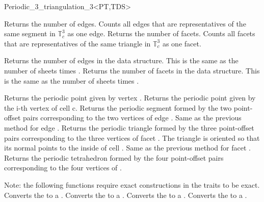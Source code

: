 \begin{ccRefClass}{Periodic_3_triangulation_3<PT,TDS>}

{Returns the number of edges. Counts all edges that are
  representatives of the same segment in $\mathbb T_c^3$ as one edge.}
\ccGlue
{}
{Returns the number of facets. Counts all facets that are
  representatives of the same triangle in $\mathbb T_c^3$ as one
  facet.}

\begin{ccAdvanced}
{Returns the number of edges in the data structure. This is the same
  as the number of sheets times .}
\ccGlue
{}
{Returns the number of facets in the data structure. This is the same
  as the number of sheets times .}
\end{ccAdvanced}


{Returns the periodic point given by vertex .}
\ccGlue
{}
{Returns the periodic point given by the i-th vertex of cell c.
}
\ccGlue
{} 
{Returns the periodic segment formed by the two point-offset pairs
  corresponding to the two vertices of edge .
}
\ccGlue
{}
{Same as the previous method for edge .}
\ccGlue
{} 
{Returns the periodic triangle formed by the three point-offset pairs
  corresponding to the three vertices of facet
. The triangle is oriented so that its normal points to the
inside of cell .
}
\ccGlue
{}
{Same as the previous method for facet .}
\ccGlue
{}
{Returns the periodic tetrahedron formed by the four point-offset pairs
  corresponding to the four vertices of .}

Note: the following functions require exact constructions in the traits to
be exact.
{Converts the   to a .}
\ccGlue
{}
{Converts the   to a .}
\ccGlue
{}
{Converts the   to a .}
\ccGlue
{}
{Converts the   to a .}


\end{ccRefClass}
